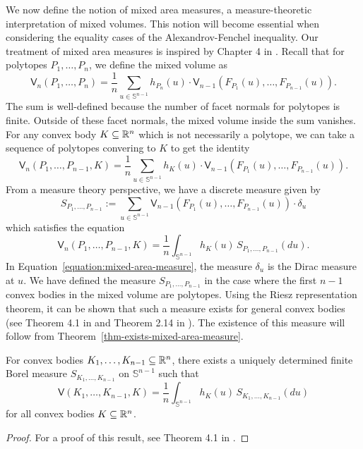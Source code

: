 \documentclass{puthesis-UG}
\begin{document}
We now define the notion of mixed area measures, a measure-theoretic interpretation of mixed volumes. This notion will become essential when considering the equality cases of the Alexandrov-Fenchel inequality. Our treatment of mixed area measures is inspired by Chapter 4 in \cite{Hug2020-ue}. Recall that for polytopes $P_1, \ldots, P_n$, we define the mixed volume as 
\[
	\mathsf{V}_n (P_1, \ldots, P_n) = \frac{1}{n} \sum_{u \in \mathbb{S}^{n-1}} h_{P_n}(u) \cdot \mathsf{V}_{n-1}(F_{P_1}(u), \ldots, F_{P_{n-1}}(u)).
\]
The sum is well-defined because the number of facet normals for polytopes is finite. Outside of these facet normals, the mixed volume inside the sum vanishes. For any convex body $K \subseteq \mathbb{R}^n$ which is not necessarily a polytope, we can take a sequence of polytopes convering to $K$ to get the identity
\[
	\mathsf{V}_n(P_1, \ldots, P_{n-1}, K) = \frac{1}{n} \sum_{u \in \mathbb{S}^{n-1}} h_{K}(u) \cdot \mathsf{V}_{n-1}(F_{P_1}(u), \ldots, F_{P_{n-1}}(u)).
\]
From a measure theory perspective, we have a discrete measure given by
\begin{equation} \label{equation:mixed-area-measure}
	S_{P_1, \ldots, P_{n-1}} := \sum_{u \in \mathbb{S}^{n-1}} \mathsf{V}_{n-1}(F_{P_1}(u), \ldots, F_{P_{n-1}}(u)) \cdot \delta_u
\end{equation}
which satisfies the equation 
\[
	\mathsf{V}_n(P_1, \ldots, P_{n-1}, K) = \frac{1}{n} \int_{\mathbb{S}^{n-1}} h_{K}(u) \, S_{P_1, \ldots, P_{n-1}}(du).
\]
In Equation~\ref{equation:mixed-area-measure}, the measure $\delta_u$ is the Dirac measure at $u$. We have defined the measure $S_{P_1, \ldots, P_{n-1}}$ in the case where the first $n-1$ convex bodies in the mixed volume are polytopes. Using the Riesz representation theorem, it can be shown that such a measure exists for general convex bodies (see Theorem 4.1 in \cite{Hug2020-ue} and Theorem 2.14 in \cite{rudin}). The existence of this measure will follow from Theorem~\ref{thm-exists-mixed-area-measure}. 

\begin{thm} \label{thm-exists-mixed-area-measure}
	For convex bodies $K_1, \ldots, K_{n-1} \subseteq \mathbb{R}^n$, there exists a uniquely determined finite Borel measure $S_{K_1, \ldots, K_{n-1}}$ on $\mathbb{S}^{n-1}$ such that 
	\[
		\mathsf{V}(K_1, \ldots, K_{n-1}, K) = \frac{1}{n} \int_{\mathbb{S}^{n-1}} h_K(u) \, S_{K_1, \ldots, K_{n-1}} (du)
	\]
	for all convex bodies $K \subseteq \mathbb{R}^n$. 
\end{thm}

\begin{proof}
	For a proof of this result, see Theorem 4.1 in \cite{Hug2020-ue}. 
\end{proof}
\end{document}
